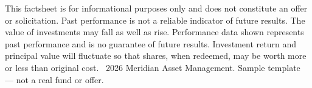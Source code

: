 \documentclass[10pt,a4paper]{article}
\begin{document}
{\color{ltslate}\fontsize{6.5}{8}\selectfont
This factsheet is for informational purposes only and does not constitute an offer or solicitation.
Past performance is not a reliable indicator of future results. The value of investments may fall as well as rise.
Performance data shown represents past performance and is no guarantee of future results. Investment return and
principal value will fluctuate so that shares, when redeemed, may be worth more or less than original cost.
\textcopyright\ 2026 Meridian Asset Management. Sample template --- not a real fund or offer.
}
\end{document}
